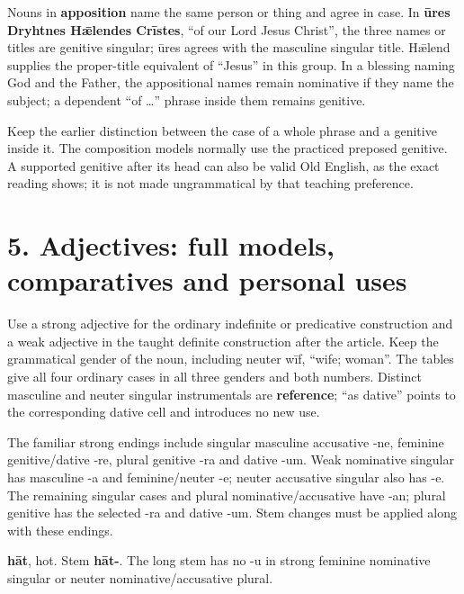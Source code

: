 Nouns in \textbf{apposition} name the same person or thing and agree in case. In \textbf{ūres Dryhtnes Hǣlendes Crīstes}, “of our Lord Jesus Christ”, the three names or titles are genitive singular; ūres agrees with the masculine singular title. Hǣlend supplies the proper-title equivalent of “Jesus” in this group. In a blessing naming God and the Father, the appositional names remain nominative if they name the subject; a dependent “of …” phrase inside them remains genitive.

Keep the earlier distinction between the case of a whole phrase and a genitive inside it. The composition models normally use the practiced preposed genitive. A supported genitive after its head can also be valid Old English, as the exact reading shows; it is not made ungrammatical by that teaching preference.

\section*{5. Adjectives: full models, comparatives and personal uses}

Use a strong adjective for the ordinary indefinite or predicative construction and a weak adjective in the taught definite construction after the article. Keep the grammatical gender of the noun, including neuter wīf, “wife; woman”. The tables give all four ordinary cases in all three genders and both numbers. Distinct masculine and neuter singular instrumentals are \textbf{reference}; “as dative” points to the corresponding dative cell and introduces no new use.

The familiar strong endings include singular masculine accusative -ne, feminine genitive/\allowbreak{}dative -re, plural genitive -ra and dative -um. Weak nominative singular has masculine -a and feminine/\allowbreak{}neuter -e; neuter accusative singular also has -e. The remaining singular cases and plural nominative/\allowbreak{}accusative have -an; plural genitive has the selected -ra and dative -um. Stem changes must be applied along with these endings.

\textbf{hāt}, hot. Stem \textbf{hāt-}. The long stem has no -u in strong feminine nominative singular or neuter nominative/\allowbreak{}accusative plural.

